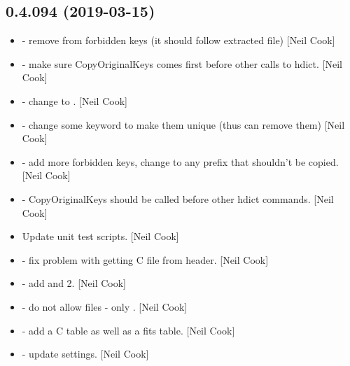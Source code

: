\documentclass[a4paper,10pt,english]{report}
\begin{document}
\subsection{0.4.094 (2019-03-15)}
\label{\detokenize{misc/changelog:id166}}\begin{itemize}
\item {} 
 - remove  from forbidden keys (it should follow
extracted file) {[}Neil Cook{]}

\item {} 
 - make sure CopyOriginalKeys comes first before other
calls to hdict. {[}Neil Cook{]}

\item {} 
 - change  to .
{[}Neil Cook{]}

\item {} 
 - change some keyword to make them unique (thus can
remove them) {[}Neil Cook{]}

\item {} 
 - add more forbidden keys, change  to any prefix
that shouldn’t be copied. {[}Neil Cook{]}

\item {} 
 - CopyOriginalKeys should be called before other
hdict commands. {[}Neil Cook{]}

\item {} 
Update unit test scripts. {[}Neil Cook{]}

\item {} 
 - fix problem with getting C file from header. {[}Neil Cook{]}

\item {} 
 - add  and 2. {[}Neil Cook{]}

\item {} 
 - do not allow  files - only . {[}Neil
Cook{]}

\item {} 
 - add a C table as well as a fits table.
{[}Neil Cook{]}

\item {} 
 - update settings. {[}Neil Cook{]}


\end{itemize}
\end{document}
